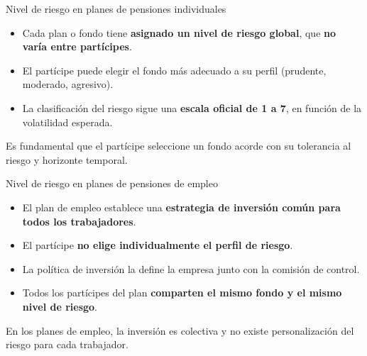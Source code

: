 \documentclass[
  ignorenonframetext,
  aspectratio=54,
  spanish,
]{beamer}
\providecommand{\tightlist}{%
  \setlength{\itemsep}{0pt}\setlength{\parskip}{0pt}}
\begin{document}
\begin{frame}{Nivel de riesgo en planes de pensiones individuales}
\label{nivel-de-riesgo-en-planes-de-pensiones-individuales}
\begin{itemize}
\tightlist
\item
  Cada plan o fondo tiene \textbf{asignado un nivel de riesgo global},
  que \textbf{no varía entre partícipes}.
\item
  El partícipe puede elegir el fondo más adecuado a su perfil (prudente,
  moderado, agresivo).
\item
  La clasificación del riesgo sigue una \textbf{escala oficial de 1 a
  7}, en función de la volatilidad esperada.
\end{itemize}

\begin{tcolorbox}[enhanced jigsaw, rightrule=.15mm, colback=white, arc=.35mm, colframe=quarto-callout-note-color-frame, bottomrule=.15mm, left=2mm, toptitle=1mm, colbacktitle=quarto-callout-note-color!10!white, leftrule=.75mm, bottomtitle=1mm, titlerule=0mm, title=\textcolor{quarto-callout-note-color}{\faInfo}\hspace{0.5em}{Nota}, opacityback=0, coltitle=black, toprule=.15mm, opacitybacktitle=0.6, breakable]

Es fundamental que el partícipe seleccione un fondo acorde con su
tolerancia al riesgo y horizonte temporal.

\end{tcolorbox}
\end{frame}

\begin{frame}{Nivel de riesgo en planes de pensiones de empleo}
\label{nivel-de-riesgo-en-planes-de-pensiones-de-empleo}
\begin{itemize}
\tightlist
\item
  El plan de empleo establece una \textbf{estrategia de inversión común
  para todos los trabajadores}.
\item
  El partícipe \textbf{no elige individualmente el perfil de riesgo}.
\item
  La política de inversión la define la empresa junto con la comisión de
  control.
\item
  Todos los partícipes del plan \textbf{comparten el mismo fondo y el
  mismo nivel de riesgo}.
\end{itemize}

\begin{tcolorbox}[enhanced jigsaw, rightrule=.15mm, colback=white, arc=.35mm, colframe=quarto-callout-note-color-frame, bottomrule=.15mm, left=2mm, toptitle=1mm, colbacktitle=quarto-callout-note-color!10!white, leftrule=.75mm, bottomtitle=1mm, titlerule=0mm, title=\textcolor{quarto-callout-note-color}{\faInfo}\hspace{0.5em}{Nota}, opacityback=0, coltitle=black, toprule=.15mm, opacitybacktitle=0.6, breakable]

En los planes de empleo, la inversión es colectiva y no existe
personalización del riesgo para cada trabajador.

\end{tcolorbox}
\end{frame}
\end{document}
